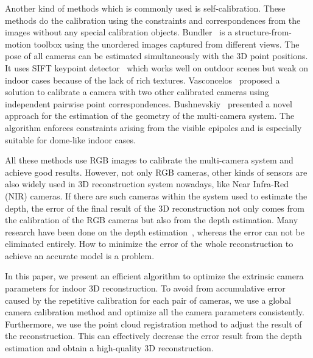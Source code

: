 Another kind of methods which is commonly used is self-calibration. These methods do the calibration using the constraints and correspondences from the images without any special calibration objects. 
Bundler~\cite{snavely2006photo} is a structure-from-motion toolbox using the unordered images captured from different views. The pose of all cameras can be estimated simultaneously with the 3D point positions. 
It uses SIFT keypoint detector~\cite{lowe2004distinctive} which works well on outdoor scenes but weak on indoor cases because of the lack of rich textures. Vasconcelos~\cite{vasconcelos2012minimal} proposed a solution to calibrate a camera with two other calibrated cameras using independent pairwise point correspondences.
% 
Bushnevskiy~\cite{bushnevskiy2016multicamera} presented a novel approach for the estimation of the geometry of the multi-camera system. The algorithm enforces constraints arising from the visible epipoles and is especially suitable for dome-like indoor cases.

All these methods use RGB images to calibrate the multi-camera system and achieve good results. However, not only RGB cameras, other kinds of sensors are also widely used in 3D reconstruction system nowadays, like Near Infra-Red (NIR) cameras. If there are such cameras within the system used to estimate the depth, the error of the final result of the 3D reconstruction not only comes from the calibration of the RGB cameras but also from the depth estimation. Many research have been done on the depth estimation~\cite{scharstein,Bleyer2011PatchMatch}, whereas the error can not be eliminated entirely. How to minimize the error of the whole reconstruction to achieve an accurate model is a problem.

In this paper, we present an efficient algorithm to optimize the extrinsic camera parameters for indoor 3D reconstruction. To avoid from accumulative error caused by the repetitive calibration for each pair of cameras, we use a global camera calibration method and optimize all the camera parameters consistently. Furthermore, we use the point cloud registration method to adjust the result of the reconstruction. This can effectively decrease the error result from the depth estimation and obtain a high-quality 3D reconstruction.


